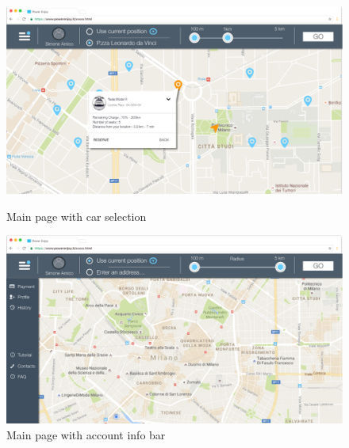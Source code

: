 \documentclass[12pt]{article}
\begin{document}
 	 	\begin{figure}
 	 	 \centering
 	 	 \includegraphics[scale=0.28]{Images/webApp/MainSearchCar.png}
		 \caption{Main page with car selection}
 	 	 \centering
 	 	 \includegraphics[scale=0.28]{Images/webApp/MainMenu.png}
		 \caption{Main page with account info bar}
		\end{figure}
		
	 \FloatBarrier
\end{document}
